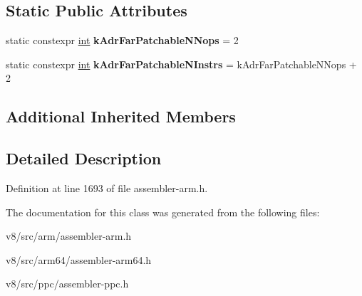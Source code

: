 \subsection*{Static Public Attributes}
\begin{DoxyCompactItemize}
\item 
\mbox{\label{classv8_1_1internal_1_1PatchingAssembler_a2db6d5d7a7f1cca597bf18b8f160c909}} 
static constexpr \mbox{\hyperlink{classint}{int}} {\bfseries k\+Adr\+Far\+Patchable\+N\+Nops} = 2
\item 
\mbox{\label{classv8_1_1internal_1_1PatchingAssembler_a57379a0fd4d9e23c8b6ca8decab5efbb}} 
static constexpr \mbox{\hyperlink{classint}{int}} {\bfseries k\+Adr\+Far\+Patchable\+N\+Instrs} = k\+Adr\+Far\+Patchable\+N\+Nops + 2
\end{DoxyCompactItemize}
\subsection*{Additional Inherited Members}


\subsection{Detailed Description}


Definition at line 1693 of file assembler-\/arm.\+h.



The documentation for this class was generated from the following files\+:\begin{DoxyCompactItemize}
\item 
v8/src/arm/assembler-\/arm.\+h\item 
v8/src/arm64/assembler-\/arm64.\+h\item 
v8/src/ppc/assembler-\/ppc.\+h\end{DoxyCompactItemize}
